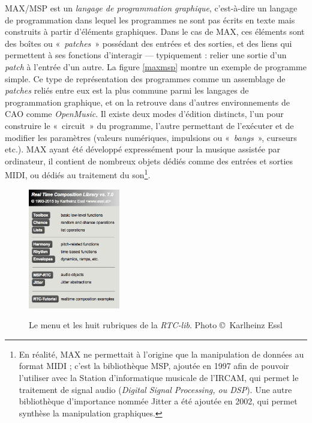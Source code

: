 \documentclass[a4paper,12pt]{article}
\newcommand{\guill}[1]{«~#1~»}
\begin{document}
MAX/MSP est un \emph{langage de programmation graphique}, c'est-à-dire un langage de programmation dans lequel les programmes ne sont pas écrits en texte mais construits à partir d'éléments graphiques. Dans le cas de MAX, ces éléments sont des boîtes ou \guill{\emph{patches}} possédant des entrées et des sorties, et des liens qui permettent à ses fonctions d'interagir --- typiquement : relier une sortie d'un \emph{patch} à l'entrée d'un autre. La figure \ref{maxmsp} montre un exemple de programme simple. Ce type de représentation des programmes comme un assemblage de \emph{patches} reliés entre eux est la plus commune parmi les langages de programmation graphique, et on la retrouve dans d'autres environnements de CAO comme \emph{OpenMusic}. Il existe deux modes d'édition distincts, l'un pour construire le \guill{circuit} du programme, l'autre permettant de l'exécuter et de modifier les paramètres (valeurs numériques, impulsions ou \guill{\emph{bangs}}, curseurs etc.). MAX ayant été développé expressément pour la musique assistée par ordinateur, il contient de nombreux objets dédiés comme des entrées et sorties MIDI, ou dédiés au traitement du son\footnote{En réalité, MAX ne permettait à l'origine que la manipulation de données au format MIDI ; c'est la bibliothèque MSP, ajoutée en 1997 afin de pouvoir l'utiliser avec la Station d'informatique musicale de l'IRCAM, qui permet le traitement de signal audio (\emph{Digital Signal Processing, ou DSP}). Une autre bibliothèque d'importance nommée Jitter a été ajoutée en 2002, qui permet synthèse la manipulation graphiques.}.

\begin{figure}[h!]
\begin{center}
\includegraphics[width=4cm]{images/rtcmenu.png}
\label{rtcmenu}
\caption{\footnotesize Le menu et les huit rubriques de la \emph{RTC-lib}. Photo \copyright~Karlheinz Essl}
\end{center}
\end{figure}
\end{document}

